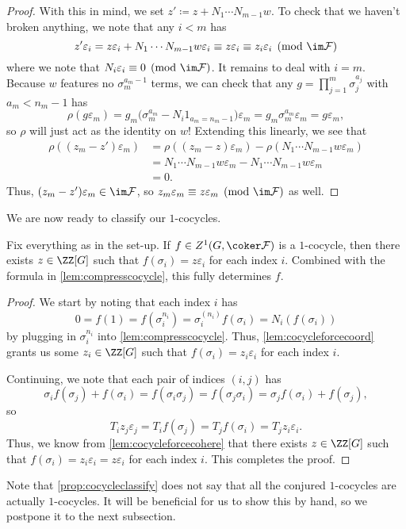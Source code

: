 \documentclass{article}
\numberwithin{equation}{section}
\begin{document}
\begin{proof}
	With this in mind, we set $z'\coloneqq z+N_1\cdots N_{m-1}w$. To check that we haven't broken anything, we note that any $i<m$ has
	\[z'\varepsilon_i=z\varepsilon_i+N_1\cdots N_{m-1}w\varepsilon_i\equiv z\varepsilon_i\equiv z_i\varepsilon_i\pmod{\im\mathcal F}\]
	where we note that $N_i\varepsilon_i\equiv0\pmod{\im\mathcal F}$. It remains to deal with $i=m$. Because $w$ features no $\sigma_m^{a_m-1}$ terms, we can check that any $g=\prod_{j=1}^m\sigma_j^{a_j}$ with $a_m<n_m-1$ has
	\[\rho(g\varepsilon_m)=g_m\big(\sigma_m^{a_m}-N_i1_{a_m=n_m-1}\big)\varepsilon_m=g_m\sigma_m^{a_m}\varepsilon_m=g\varepsilon_m,\]
	so $\rho$ will just act as the identity on $w$! Extending this linearly, we see that
	\begin{align*}
		\rho((z_m-z')\varepsilon_m) &= \rho((z_m-z)\varepsilon_m)-\rho(N_1\cdots N_{m-1}w\varepsilon_m) \\
		&= N_1\cdots N_{m-1}w\varepsilon_m-N_1\cdots N_{m-1}w\varepsilon_m \\
		&= 0.
	\end{align*}
	Thus, $(z_m-z')\varepsilon_m\in\im\mathcal F$, so $z_m\varepsilon_m\equiv z\varepsilon_m\pmod{\im\mathcal F}$ as well.
\end{proof}
We are now ready to classify our $1$-cocycles.
\begin{proposition} \label{prop:cocycleclassify}
	Fix everything as in the set-up. If $f\in Z^1(G,\coker\mathcal F)$ is a $1$-cocycle, then there exists $z\in\ZZ[G]$ such that $f(\sigma_i)=z\varepsilon_i$ for each index $i$. Combined with the formula in \autoref{lem:compresscocycle}, this fully determines $f$.
\end{proposition}
\begin{proof}
	We start by noting that each index $i$ has
	\[0=f(1)=f\left(\sigma_i^{n_i}\right)=\sigma_i^{(n_i)}f(\sigma_i)=N_i(f(\sigma_i))\]
	by plugging in $\sigma_i^{n_i}$ into \autoref{lem:compresscocycle}. Thus, \autoref{lem:cocycleforcecoord} grants us some $z_i\in\ZZ[G]$ such that $f(\sigma_i)=z_i\varepsilon_i$ for each index $i$.

	Continuing, we note that each pair of indices $(i,j)$ has
	\[\sigma_if(\sigma_j)+f(\sigma_i)=f(\sigma_i\sigma_j)=f(\sigma_j\sigma_i)=\sigma_jf(\sigma_i)+f(\sigma_j),\]
	so
	\[T_iz_j\varepsilon_j=T_if(\sigma_j)=T_jf(\sigma_i)=T_jz_i\varepsilon_i.\]
	Thus, we know from \autoref{lem:cocycleforcecohere} that there exists $z\in\ZZ[G]$ such that $f(\sigma_i)=z_i\varepsilon_i=z\varepsilon_i$ for each index $i$. This completes the proof.
\end{proof}
Note that \autoref{prop:cocycleclassify} does not say that all the conjured $1$-cocycles are actually $1$-cocycles. It will be beneficial for us to show this by hand, so we postpone it to the next subsection.
\end{document}
